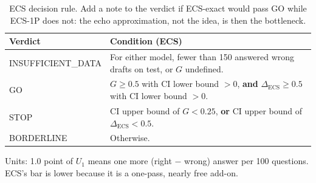 \documentclass[11pt]{article}
\begin{document}
\begin{table}[H]
\centering
\small
\begin{tabularx}{\textwidth}{@{}lL@{}}
\toprule
Verdict & Condition (ECS) \\
\midrule
INSUFFICIENT\_DATA & For either model, fewer than 150 answered wrong drafts on test, or $G$ undefined. \\
GO & $G \ge 0.5$ with CI lower bound $> 0$, \textbf{and} $\Delta_{\mathrm{ECS}} \ge 0.5$ with CI lower
     bound $> 0$. \\
STOP & CI upper bound of $G < 0.25$, \textbf{or} CI upper bound of $\Delta_{\mathrm{ECS}} < 0.5$. \\
BORDERLINE & Otherwise. \\
\bottomrule
\end{tabularx}
\caption{ECS decision rule. Add a note to the verdict if ECS-exact would pass GO while ECS-1P does not:
the echo approximation, not the idea, is then the bottleneck.}
\end{table}

\noindent Units: 1.0 point of $U_1$ means one more (right $-$ wrong) answer per 100 questions. ECS's bar is
lower because it is a one-pass, nearly free add-on.

\end{document}
